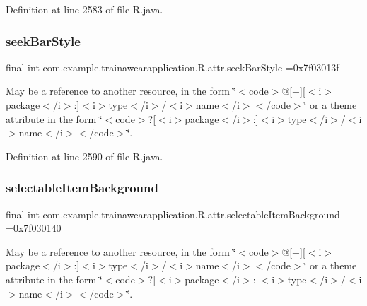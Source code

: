 Definition at line 2583 of file R.\+java.

\mbox{\label{classcom_1_1example_1_1trainawearapplication_1_1_r_1_1attr_a76c1deb517935519b4e3563a87403b56}} 
\subsubsection{\texorpdfstring{seekBarStyle}{seekBarStyle}}
{\footnotesize\ttfamily final int com.\+example.\+trainawearapplication.\+R.\+attr.\+seek\+Bar\+Style =0x7f03013f\hspace{0.3cm}{\ttfamily [static]}}

May be a reference to another resource, in the form \char`\"{}$<$code$>$@\mbox{[}+\mbox{]}\mbox{[}$<$i$>$package$<$/i$>$\+:\mbox{]}$<$i$>$type$<$/i$>$/$<$i$>$name$<$/i$>$$<$/code$>$\char`\"{} or a theme attribute in the form \char`\"{}$<$code$>$?\mbox{[}$<$i$>$package$<$/i$>$\+:\mbox{]}$<$i$>$type$<$/i$>$/$<$i$>$name$<$/i$>$$<$/code$>$\char`\"{}. 

Definition at line 2590 of file R.\+java.

\mbox{\label{classcom_1_1example_1_1trainawearapplication_1_1_r_1_1attr_a7e87b948b75576f410ab8bea526c2fad}} 
\subsubsection{\texorpdfstring{selectableItemBackground}{selectableItemBackground}}
{\footnotesize\ttfamily final int com.\+example.\+trainawearapplication.\+R.\+attr.\+selectable\+Item\+Background =0x7f030140\hspace{0.3cm}{\ttfamily [static]}}

May be a reference to another resource, in the form \char`\"{}$<$code$>$@\mbox{[}+\mbox{]}\mbox{[}$<$i$>$package$<$/i$>$\+:\mbox{]}$<$i$>$type$<$/i$>$/$<$i$>$name$<$/i$>$$<$/code$>$\char`\"{} or a theme attribute in the form \char`\"{}$<$code$>$?\mbox{[}$<$i$>$package$<$/i$>$\+:\mbox{]}$<$i$>$type$<$/i$>$/$<$i$>$name$<$/i$>$$<$/code$>$\char`\"{}. 

